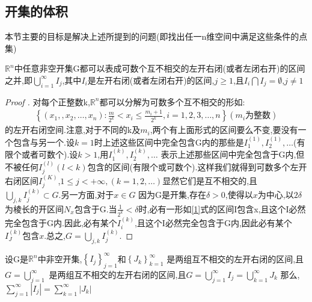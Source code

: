 \subsection{开集的体积} %
\label{sec:开集的体积}
本节主要的目标是解决上述所提到的问题(即找出任一n维空间中满足这些条件的点集)
\begin{Lemma}
  \(\mathbb{R}^n \)中任意非空开集G都可以表成可数个互不相交的左开右闭(或者左闭右开)的区间之并,即\(\bigcup\limits_{i=1}^{\infty}I_j \),其中\(I_i \)是左开右闭(或者左闭右开)的区间,\(j\geq 1 \),且\(I_i \bigcap I_j =\emptyset\),\(j\neq 1\)
\end{Lemma}
\begin{proof}[Proof ]
  对每个正整数k,\(\mathbb{R}^n\)都可以分解为可数多个互不相交的形如: 
  \begin{align*}\label{1}
    \left\{(x_1,,x_2,\dots,x_n): \frac{m}{2^k} <x_i \leq \frac{m_i +1}{2^k},i=1,2,3,\dots,n\right\} (m_i \text{为整数})
  \end{align*}
  的左开右闭空间.注意,对于不同的k及\(m_i\),两个有上面形式的区间要么不变,要没有一个包含与另一个.设\(k=1\)时上述这些区间中完全包含G内的那些是\(I_1^{(1)},I_2^{(1)} ,\dots \)(有限个或者可数个).设\(k>1\),用\(I_1^{(k)},I_2^{(k)},\dots \)
  表示上述那些区间中完全包含于G内,但不被任何\(I^{(l)}_j (l <k)\)包含的区间(有限个或可数个).这样我们就得到可数多个左开右闭区间\(I_j^{(K)}\),\(1\leq j<+\infty , (k=1,2,\dots)\)显然它们是互不相交的,且\(\bigcup\limits_{j,k} I_j^{(k)} \subset G \).另一方面,对于\(x\in G\)
  因为G是开集,存在\(\delta >0\),使得以\(x\)为中心,以\(2\delta\)为棱长的开区间\(N_x\)包含于G.当\(\frac{1}{2^k} < \delta\)时,必有一形如\ref{1}式的区间I包含x,且这个I必然完全包含于G内.因此,必有某个\(I_i^{(k)}\),且这个I必然完全包含于G内,因此必有某个\(I_J^{(k)}\)包含\(x\).总之,\(G =\bigcup\limits_{j,k} I_j^{(k)}\).
\end{proof}
\begin{Lemma}
  设G是\(\mathbb{R}^n \)中非空开集,\(\left\{I_j\right\}_{j=1}^{\infty} \)和\(\left\{J_k\right\}_{k=1}^{\infty}\) 是两组互不相交的左开右闭的区间,且\(G = \bigcup\limits_{j=1}^{\infty}\)
  是两组互不相交的左开右闭的区间,且\(G = \bigcup\limits_{j=1}^{\infty} I_j = \bigcup\limits_{k=1}^{\infty} J_k\)
  那么,
  \(\sum_{j=1}^{\infty} |I_j| = \sum_{k=1}^{\infty} |J_k| \)
\end{Lemma}

